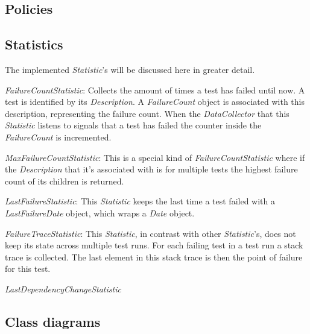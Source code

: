 \documentclass[i2]{oss}
\newcommand{\class}[1]{\emph{#1}}
\begin{document}
\subsection{Policies}



\subsection{Statistics}

The implemented \class{Statistic}'s will be discussed here in greater 
detail.
\begin{description}
\item \class{FailureCountStatistic}: Collects the amount of times a test 
has failed until now.
A test is identified by its \class{Description}.
A \class{FailureCount} object is associated with this description,
representing the failure count.
When the \class{DataCollector} that this \class{Statistic} listens to
signals that a test has failed the counter inside the 
\class{FailureCount} is incremented.
\item \class{MaxFailureCountStatistic}: This is a special kind of 
\class{FailureCountStatistic} where if the \class{Description} that it's
associated with is for multiple tests the highest failure count of its 
children is returned.
\item \class{LastFailureStatistic}: This \class{Statistic} keeps the 
last time a test failed with a \class{LastFailureDate} object, which
wraps a \class{Date} object.
\item \class{FailureTraceStatistic}: This \class{Statistic}, in contrast
with other \class{Statistic}'s, does not keep its state across multiple
test runs.
For each failing test in a test run a stack trace is collected. 
The last element in this stack trace is then the point of failure for 
this test.

\item \class{LastDependencyChangeStatistic}
\end{description}

\subsection{Class diagrams} %
\label{ssec:Klassendiagramma}
\end{document}
